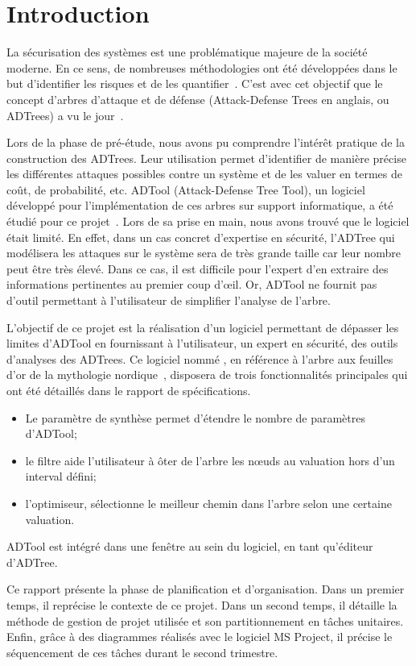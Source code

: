 \section{Introduction}
    \label{sec:intro}

    La sécurisation des systèmes est une problématique majeure de la société moderne. En ce sens, de nombreuses méthodologies ont été développées dans le but d'identifier les risques et de les quantifier~\cite{survey}. C'est avec cet objectif que le concept d'arbres d'attaque et de défense (\og Attack-Defense Trees \fg{} en anglais, ou ADTrees) a vu le jour~\cite{JLC}.

    Lors de la phase de pré-étude, nous avons pu comprendre l’intérêt pratique de la construction des ADTrees. Leur utilisation permet d'identifier de manière précise les différentes attaques possibles contre un système et de les valuer en termes de coût, de probabilité, etc. ADTool (Attack-Defense Tree Tool), un logiciel développé pour l'implémentation de ces arbres sur support informatique, a été étudié pour ce projet~\cite{ADTool}. Lors de sa prise en main, nous avons trouvé que le logiciel était limité. En effet, dans un cas concret d'expertise en sécurité, l'ADTree qui modélisera les attaques sur le système sera de très grande taille car leur nombre peut être très élevé. Dans ce cas, il est difficile pour l'expert d'en extraire des informations pertinentes au premier coup d’œil. Or, ADTool ne fournit pas d'outil permettant à l'utilisateur de simplifier l'analyse de l'arbre. 

    L'objectif de ce projet est la réalisation d'un logiciel permettant de dépasser les limites d'ADTool en fournissant à l'utilisateur, un expert en sécurité, des outils d'analyses des ADTrees. Ce logiciel nommé \glasir{}, en référence à l'arbre aux feuilles d'or de la mythologie nordique~\cite{vikingCulture}, disposera de trois fonctionnalités principales qui ont été détaillés dans le rapport de spécifications. 
    \begin{itemize}
    	\item Le paramètre de synthèse permet d'étendre le nombre de paramètres d'ADTool;
    	\item le filtre aide l'utilisateur à ôter de l’arbre les nœuds au valuation hors d'un interval défini;
    	\item l'optimiseur, sélectionne le meilleur chemin dans l'arbre selon une certaine valuation.
    \end{itemize}
    ADTool est intégré dans une fenêtre au sein du logiciel, en tant qu'éditeur d'ADTree. 



    Ce rapport présente la phase de planification et d'organisation. Dans un premier temps, il reprécise le contexte de ce projet. Dans un second temps, il détaille la méthode de gestion de projet utilisée et son partitionnement en tâches unitaires. Enfin, grâce à des diagrammes réalisés avec le logiciel MS Project, il précise le séquencement de ces tâches durant le second trimestre.